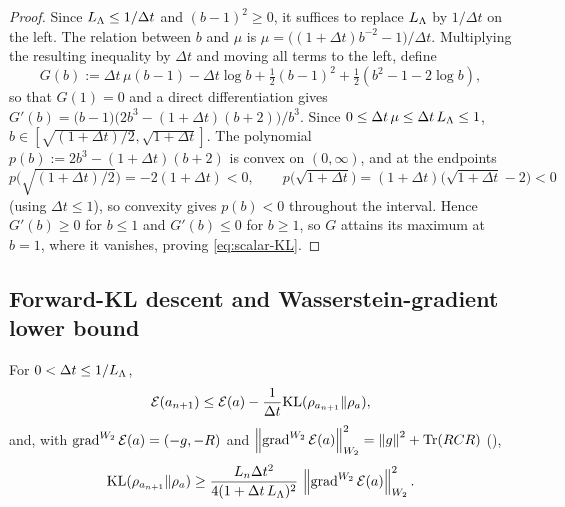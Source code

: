 \begin{proof}
Since $L_\Lambda\leq1/\Delta t$ and $(b-1)^2\geq0$, it suffices to replace $L_\Lambda$ by $1/\Delta t$ on the left.
The relation between $b$ and $\mu$ is $\mu=\bigl((1+\Delta t)b^{-2}-1\bigr)/\Delta t$. Multiplying the
resulting inequality by $\Delta t$ and moving all terms to the left, define
\[
    G(b):=\Delta t\,\mu(b-1)-\Delta t\log b+\tfrac12(b-1)^2+\tfrac12(b^2-1-2\log b),
\]
so that $G(1)=0$ and a direct differentiation gives
$G'(b)=\bigl(b-1\bigr)\bigl(2b^3-(1+\Delta t)(b+2)\bigr)/b^3$. Since $0\leq\Delta t\,\mu\leq\Delta t\,L_\Lambda\leq1$,
$b\in[\sqrt{(1+\Delta t)/2},\sqrt{1+\Delta t}]$. The polynomial $p(b):=2b^3-(1+\Delta t)(b+2)$ is convex
on $(0,\infty)$, and at the endpoints
\[
    p\!\bigl(\sqrt{(1+\Delta t)/2}\bigr)=-2(1+\Delta t)<0,
    \qquad
    p\!\bigl(\sqrt{1+\Delta t}\bigr)=(1+\Delta t)\bigl(\sqrt{1+\Delta t}-2\bigr)<0
\]
(using $\Delta t\leq1$), so convexity gives $p(b)<0$ throughout the interval. Hence $G'(b)\geq0$ for
$b\leq1$ and $G'(b)\leq0$ for $b\geq1$, so $G$ attains its maximum at $b=1$, where it vanishes,
proving \eqref{eq:scalar-KL}.
\end{proof}

\subsection{Forward-KL descent and Wasserstein-gradient lower bound}
\label{app:KL-descent}

\begin{lemma}
\label{lem:KL-onestep-app}
For $0<\Delta t\leq1/L_\Lambda$,
\begin{equation}
\label{eq:KL-descent-app}
    \mathcal{E}(a_{n+1})\leq\mathcal{E}(a)-\frac1{\Delta t}\mathrm{KL}(\rho_{a_{n+1}}\|\rho_a),
\end{equation}
and, with $\operatorname{grad}^{W_2}\mathcal{E}(a)=(-g,-R)$ and
$\left\lVert \operatorname{grad}^{W_2}\mathcal{E}(a)\right\rVert_{W_2}^2=\left\lVert g\right\rVert^2+\operatorname{Tr}(RCR)$ (),
\begin{equation}
\label{eq:KL-lower}
    \mathrm{KL}(\rho_{a_{n+1}}\|\rho_a)\geq\frac{L_n\Delta t^2}{4(1+\Delta t\,L_\Lambda)^2}\,\left\lVert \operatorname{grad}^{W_2}\mathcal{E}(a)\right\rVert_{W_2}^2 .
\end{equation}
\end{lemma}

